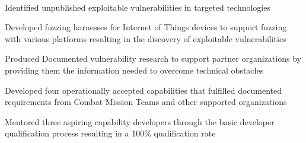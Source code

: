 \documentclass[]{resume}
\begin{document}
\begin{minipage}[t]{0.69\textwidth}
 \\
\begin{tightemize}
\item Identified unpublished exploitable vulnerabilities in targeted technologies
\item Developed fuzzing harnesses for Internet of Things devices to support fuzzing with various platforms resulting in the discovery of exploitable vulnerabilities
\item Produced Documented vulnerability research to support partner organizations by providing them the information needed to overcome technical obstacles
\item Developed four operationally accepted capabilities that fulfilled documented requirements from Combat Mission Teams and other supported organizations
\item Mentored three aspiring capability developers through the basic developer qualification process resulting in a 100\% qualification rate
\end{tightemize}

\sectionsep


\end{minipage}
\end{document}
